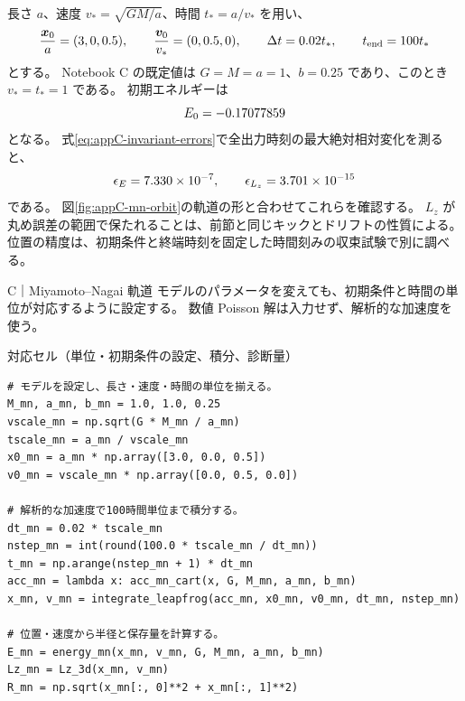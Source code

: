 長さ $a$、速度 $v_*=\sqrt{GM/a}$、時間 $t_*=a/v_*$ を用い、
\begin{equation}
 \frac{\boldsymbol x_0}{a}=(3,0,0.5),\qquad
 \frac{\boldsymbol v_0}{v_*}=(0,0.5,0),\qquad
 \Delta t=0.02t_*,\qquad t_{\rm end}=100t_*
\end{equation}
とする。
Notebook C の既定値は $G=M=a=1$、$b=0.25$ であり、このとき $v_*=t_*=1$ である。
初期エネルギーは
\begin{equation}
 E_0=-0.17077859
\end{equation}
となる。
式\eqref{eq:appC-invariant-errors}で全出力時刻の最大絶対相対変化を測ると、
\begin{equation}
 \epsilon_E=7.330\times 10^{-7},\qquad
 \epsilon_{L_z}=3.701\times 10^{-15}
\end{equation}
である。
図\ref{fig:appC-mn-orbit}の軌道の形と合わせてこれらを確認する。
$L_z$ が丸め誤差の範囲で保たれることは、前節と同じキックとドリフトの性質による。
位置の精度は、初期条件と終端時刻を固定した時間刻みの収束試験で別に調べる。

\begin{notebookblock}{C｜Miyamoto--Nagai 軌道}
モデルのパラメータを変えても、初期条件と時間の単位が対応するように設定する。
数値 Poisson 解は入力せず、解析的な加速度を使う。
\par\smallskip\noindent\begin{minipage}{\linewidth}
{\sffamily\small\color{graytext}対応セル（単位・初期条件の設定、積分、診断量）}
\begin{Verbatim}[fontsize=\footnotesize,xleftmargin=2mm,frame=single,framesep=1.8mm,framerule=0.35pt,rulecolor=\color{listingframe},fillcolor=\color{listingbg}]
# モデルを設定し、長さ・速度・時間の単位を揃える。
M_mn, a_mn, b_mn = 1.0, 1.0, 0.25
vscale_mn = np.sqrt(G * M_mn / a_mn)
tscale_mn = a_mn / vscale_mn
x0_mn = a_mn * np.array([3.0, 0.0, 0.5])
v0_mn = vscale_mn * np.array([0.0, 0.5, 0.0])

# 解析的な加速度で100時間単位まで積分する。
dt_mn = 0.02 * tscale_mn
nstep_mn = int(round(100.0 * tscale_mn / dt_mn))
t_mn = np.arange(nstep_mn + 1) * dt_mn
acc_mn = lambda x: acc_mn_cart(x, G, M_mn, a_mn, b_mn)
x_mn, v_mn = integrate_leapfrog(acc_mn, x0_mn, v0_mn, dt_mn, nstep_mn)

# 位置・速度から半径と保存量を計算する。
E_mn = energy_mn(x_mn, v_mn, G, M_mn, a_mn, b_mn)
Lz_mn = Lz_3d(x_mn, v_mn)
R_mn = np.sqrt(x_mn[:, 0]**2 + x_mn[:, 1]**2)
\end{Verbatim}
\end{minipage}

\end{notebookblock}

